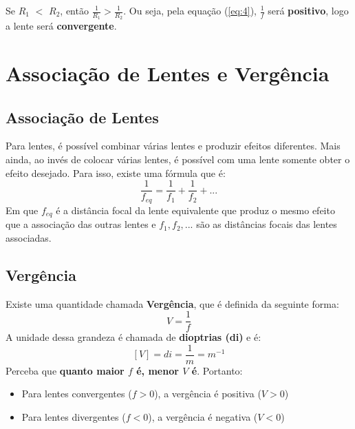 \documentclass[12pt]{extarticle}
\newcommand{\<}{\langle}
\renewcommand{\>}{\rangle}
\theoremstyle{definition}
\begin{document}
Se $R_{1}$ $<$ $R_{2}$, então $\frac{1}{R_{1}} > \frac{1}{R_{2}}$. Ou seja, pela equação (\ref{eq:4}), $\frac{1}{f}$ será \textbf{positivo}, logo a lente será \textbf{convergente}.

\section{Associação de Lentes e Vergência}
\subsection{Associação de Lentes}

Para lentes, é possível combinar várias lentes e produzir efeitos diferentes. Mais ainda, ao invés de colocar várias lentes, é possível com uma lente somente obter o efeito desejado. Para isso, existe uma fórmula que é:
\begin{equation} \label{eq:5}
    \frac{1}{f_{eq}}= \frac{1}{f_{1}} + \frac{1}{f_{2}} + ...
\end{equation}
Em que $f_{eq}$ é a distância focal da lente equivalente que produz o mesmo efeito que a associação das outras lentes e $f_{1}, f_{2},...$ são as distâncias focais das lentes associadas.

\subsection{Vergência}

Existe uma quantidade chamada \textbf{Vergência}, que é definida da seguinte forma:
\begin{equation} \label{eq:6}
    V= \frac{1}{f}
\end{equation}
A unidade dessa grandeza é chamada de \textbf{dioptrias (di)} e é:
\begin{equation} \label{eq:7}
    [V]= di = \frac{1}{m} = m^{-1}
\end{equation}
Perceba que \textbf{quanto maior $f$ é, menor $V$ é}. Portanto:
\begin{itemize}
    \item 
    Para lentes convergentes ($f>0$), a vergência é positiva ($V>0$)
    \item
    Para lentes divergentes ($f<0$), a vergência é negativa ($V<0$)
\end{itemize}
\end{document}
